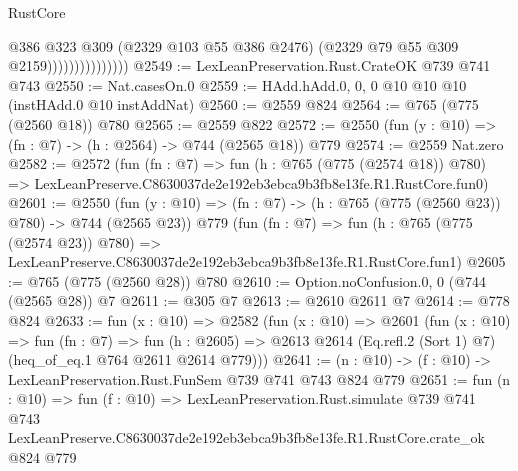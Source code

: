 \begin{lexlean}{RustCore}
\begin{coremodule}
                                @386
                                @323
                                @309
                                (@2329 @103 @55 @386 @2476)
                                (@2329 @79 @55 @309 @2159)))))))))))))))
@2549 := LexLeanPreservation.Rust.CrateOK @739 @741 @743
@2550 := Nat.casesOn.{0}
@2559 := HAdd.hAdd.{0, 0, 0} @10 @10 @10 (instHAdd.{0} @10 instAddNat)
@2560 := @2559 @824
@2564 := @765 (@775 (@2560 @18)) @780
@2565 := @2559 @822
@2572 := @2550 (fun (y : @10) => (fn : @7) -> (h : @2564) -> @744 (@2565 @18)) @779
@2574 := @2559 Nat.zero
@2582 := @2572
    (fun (fn : @7) =>
    fun (h : @765 (@775 (@2574 @18)) @780) =>
    LexLeanPreserve.C8630037de2e192eb3ebca9b3fb8e13fe.R1.RustCore.fun0)
@2601 := @2550
    (fun (y : @10) => (fn : @7) -> (h : @765 (@775 (@2560 @23)) @780) -> @744 (@2565 @23))
    @779
    (fun (fn : @7) =>
    fun (h : @765 (@775 (@2574 @23)) @780) =>
    LexLeanPreserve.C8630037de2e192eb3ebca9b3fb8e13fe.R1.RustCore.fun1)
@2605 := @765 (@775 (@2560 @28)) @780
@2610 := Option.noConfusion.{0, 0} (@744 (@2565 @28)) @7
@2611 := @305 @7
@2613 := @2610 @2611 @7
@2614 := @778 @824
@2633 := fun (x : @10) =>
  @2582
    (fun (x : @10) =>
    @2601
      (fun (x : @10) =>
      fun (fn : @7) =>
      fun (h : @2605) =>
      @2613 @2614 (Eq.refl.{2} (Sort 1) @7) (heq_of_eq.{1} @764 @2611 @2614 @779)))
@2641 := (n : @10) -> (f : @10) -> LexLeanPreservation.Rust.FunSem @739 @741 @743 @824 @779
@2651 := fun (n : @10) =>
  fun (f : @10) =>
  LexLeanPreservation.Rust.simulate
    @739
    @741
    @743
    LexLeanPreserve.C8630037de2e192eb3ebca9b3fb8e13fe.R1.RustCore.crate_ok
    @824
    @779
\end{coremodule}
\end{lexlean}
